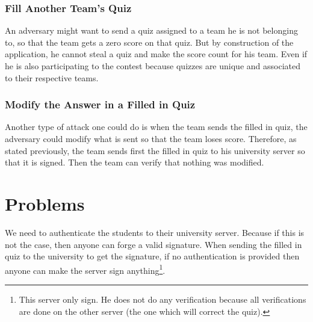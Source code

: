     \subsubsection{Fill Another Team's Quiz}
    An adversary might want to send a quiz assigned to a team he is not belonging to, so that the team gets a zero score on that quiz. 
    But by construction of the application, he cannot steal a quiz and make the score count for his team. Even if he is also participating to the contest
    because quizzes are unique and associated to their respective teams.
    \subsubsection{Modify the Answer in a Filled in Quiz}
    Another type of attack one could do is when the team sends the filled in quiz, the adversary could modify what is sent so that the team loses score. 
    Therefore, as stated previously, the team sends first the filled in quiz to his university server so that it is signed. Then the team can verify 
    that nothing was modified. 

    \section{Problems}
    \label{sec:app-problem}
    We need to authenticate the students to their university server. Because if this is not the case, then anyone can forge a valid signature. 
    When sending the filled in quiz 
    to the university to get the signature, if no authentication is provided then anyone can make the server sign anything\footnote{This server only sign.
    He does not do any verification because all verifications are done on the other server (the one which will correct the quiz).}.


